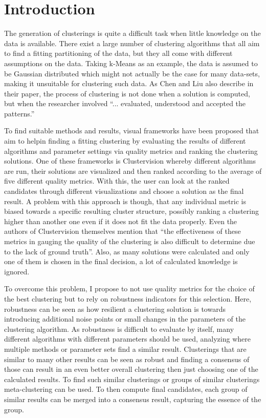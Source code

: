 \iffalse  \fi

\chapter{Introduction}
\label{cha:Introduction}

The generation of clusterings is quite a difficult task when little knowledge on the data is available. There exist a large number of clustering algorithms that all aim to find a fitting partitioning of the data, but they all come with different assumptions on the data. Taking k-Means as an example, the data is assumed to be Gaussian distributed which might not actually be the case for many data-sets, making it unsuitable for clustering such data. As Chen and Liu \cite{VISTA} also describe in their paper, the process of clustering is not done when a solution is computed, but when the researcher involved ``... evaluated, understood and accepted the patterns.''

To find suitable methods and results, visual frameworks have been proposed that aim to helpin  finding a fitting clustering by evaluating the results of different algorithms and parameter settings via quality metrics and ranking the clustering solutions. One of these frameworks is Clustervision \cite{Kwon2018ClustervisionVS} whereby different algorithms are run, their solutions are visualized and then ranked according to the average of five different quality metrics. With this, the user can look at the ranked candidates through different visualizations and choose a solution as the final result. A problem with this approach is though, that any individual metric is biased towards a specific resulting cluster structure, possibly ranking a clustering higher than another one even if it does not fit the data properly. Even the authors of Clustervision themselves mention that ``the effectiveness of these metrics in gauging the quality of the clustering is also difficult to determine due to the lack of ground truth''. Also, as many solutions were calculated and only one of them is chosen in the final decision, a lot of calculated knowledge is ignored.

To overcome this problem, I propose to not use quality metrics for the choice of the best clustering but to rely on robustness indicators for this selection. Here, robustness can be seen as how resilient a clustering solution is towards introducing additional noise points or small changes in the parameters of the clustering algorithm. As robustness is difficult to evaluate by itself, many different algorithms with different parameters should be used, analyzing where multiple methods or parameter sets find a similar result. Clusterings that are similar to many other results can be seen as robust and finding a consensus of those can result in an even better overall clustering then just choosing one of the calculated results. To find such similar clusterings or groups of similar clusterings meta-clustering can be used. To then compute final candidates, each group of similar results can be merged into a consensus result, capturing the essence of the group. 

